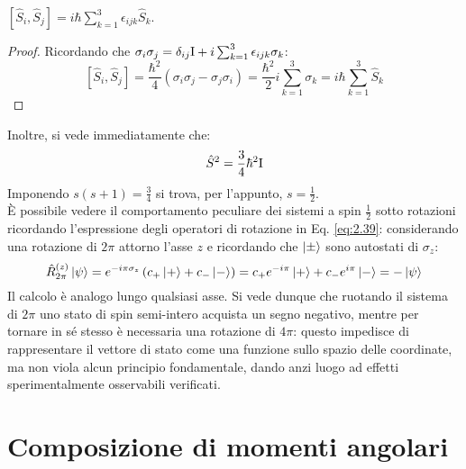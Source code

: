 \begin{proposition}
	$ \left[ \hat{S}_i,\hat{S}_j \right] = i\hbar \sum_{k = 1}^{3} \epsilon_{ijk} \hat{S}_k $.
\end{proposition}
\begin{proof}
	Ricordando che $ \sigma_i \sigma_j = \delta_{ij} \mathbf{\text{I}} + i \sum_{k = 1}^{3} \epsilon_{ijk} \sigma_k $:
	\begin{equation*}
		\left[ \hat{S}_i,\hat{S}_j \right] = \frac{\hbar^2}{4} \left( \sigma_i \sigma_j - \sigma_j \sigma_i \right) = \frac{\hbar^2}{2} i \sum_{k = 1}^{3} \sigma_k = i\hbar \sum_{k = 1}^{3} \hat{S}_k
	\end{equation*}
\end{proof}

Inoltre, si vede immediatamente che:
\begin{equation}
	\hat{S}^2 = \frac{3}{4} \hbar^2 \mathbf{\text{I}}
	\label{eq:2.49}
\end{equation}
Imponendo $ s (s + 1) = \frac{3}{4} $ si trova, per l'appunto, $ s = \frac{1}{2} $.\\
È possibile vedere il comportamento peculiare dei sistemi a spin $ \frac{1}{2} $ sotto rotazioni ricordando l'espressione degli operatori di rotazione in Eq. \ref{eq:2.39}: considerando una rotazione di $ 2\pi $ attorno l'asse $ z $ e ricordando che $ \ket{\pm} $ sono autostati di $ \sigma_z $:
\begin{equation}
	\hat{R}_{2\pi}^{(z)} \ket{\psi} = e^{-i \pi \sigma_z} \left( c_+ \ket{+} + c_- \ket{-} \right) = c_+ e^{-i\pi} \ket{+} + c_- e^{i\pi} \ket{-} = - \ket{\psi}
	\label{eq:2.50}
\end{equation}
Il calcolo è analogo lungo qualsiasi asse. Si vede dunque che ruotando il sistema di $ 2\pi $ uno stato di spin semi-intero acquista un segno negativo, mentre per tornare in sé stesso è necessaria una rotazione di $ 4\pi $: questo impedisce di rappresentare il vettore di stato come una funzione sullo spazio delle coordinate, ma non viola alcun principio fondamentale, dando anzi luogo ad effetti sperimentalmente osservabili verificati.

\section{Composizione di momenti angolari}

